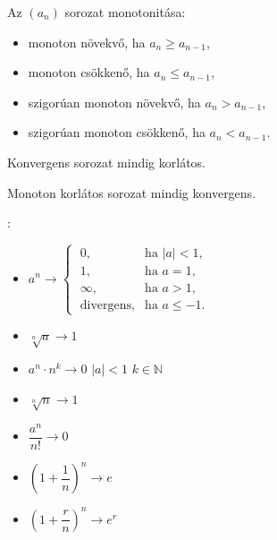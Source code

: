 \documentclass[a4paper, 12pt]{scrartcl}
\begin{document}
\begin{definition}
  Az $(a_n)$ sorozat monotonitása:
  \begin{itemize}
    \item monoton növekvő, ha $a_n \geq a_{n-1}$,
    \item monoton csökkenő, ha $a_n \leq a_{n-1}$,
    \item szigorúan monoton növekvő, ha $a_n > a_{n-1}$,
    \item szigorúan monoton csökkenő, ha $a_n < a_{n-1}$.
  \end{itemize}
\end{definition}

\begin{note}
  Konvergens sorozat mindig korlátos.
\end{note}

\begin{note}
  Monoton korlátos sorozat mindig konvergens.
\end{note}

\begin{blueBox}
  :

  \begin{itemize}
    \item $
            a^n \rightarrow \begin{cases}
              \;0,                & \text{ha } |a| < 1,   \\
              \;1,                & \text{ha } a = 1,     \\
              \;\infty,           & \text{ha } a > 1,     \\
              \;\text{divergens}, & \text{ha } a \leq -1.
            \end{cases}
          $

    \item $
            \sqrt[n]{a} \rightarrow 1
          $

    \item $
            a^n \cdot n^k \rightarrow 0
          $
          $
            |a|<1
          $
          $
            k \in \mathbb N
          $

    \item  $
            \sqrt[n]{n} \rightarrow 1
          $

    \item $
            \dfrac{a^n}{n!} \rightarrow 0
          $

    \item $
            \left(1 + \dfrac{1}{n}\right)^n \rightarrow e
          $

    \item $
            \left(1 + \dfrac{r}{n}\right)^n \rightarrow e^r
          $
  \end{itemize}
\end{blueBox}
\end{document}

